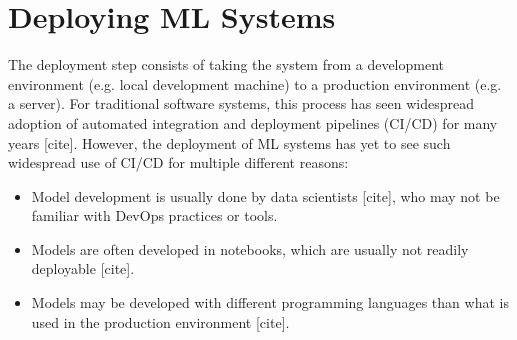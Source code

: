 \section{Deploying ML Systems}
The deployment step consists of taking the system from a development environment (e.g. local development machine) to a production environment (e.g. a server).
For traditional software systems, this process has seen widespread adoption of automated integration and deployment pipelines (CI/CD) for many years [cite].
However, the deployment of ML systems has yet to see such widespread use of CI/CD for multiple different reasons:
\begin{itemize}
    \item Model development is usually done by data scientists [cite], who may not be familiar with DevOps practices or tools.
    \item Models are often developed in notebooks, which are usually not readily deployable [cite].
    \item Models may be developed with different programming languages than what is used in the production environment [cite].
\end{itemize}
